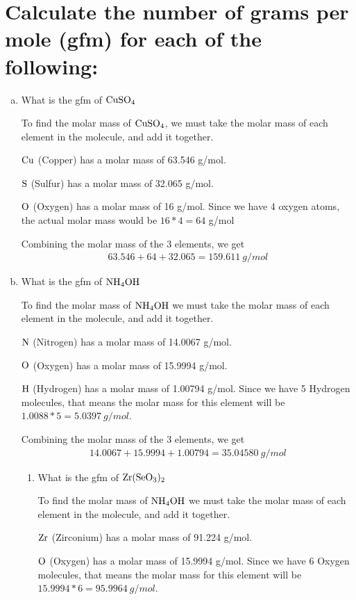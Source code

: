 \documentclass[11pt]{article}
\begin{document}
\section{Calculate the number of grams per mole (gfm) for each of the following:}
\label{sec:org96969ac}
\begin{enumerate}[(a)]
\item What is the gfm of \(\ce{CuSO4}\)

To find the molar mass of \(\ce{CuSO4}\), we must take the molar mass of
each element in the molecule, and add it together.

\(\ce{Cu}\) (Copper) has a molar mass of 63.546 g/mol.

\(\ce{S}\) (Sulfur) has a molar mass of 32.065 g/mol.

\(\ce{O}\) (Oxygen) has a molar mass of 16 g/mol. Since we have 4 oxygen
atoms, the actual molar mass would be \(16*4=64\) g/mol

Combining the molar mass of the 3 elements, we get
\begin{align*}
63.546+64+32.065=159.611\ g/mol
\end{align*}

\item What is the gfm of \(\ce{NH4OH}\)

To find the molar mass of \(\ce{NH4OH}\) we must take the molar mass of each element in the molecule, and add it together.

\(\ce{N}\) (Nitrogen) has a molar mass of 14.0067 g/mol.

\(\ce{O}\) (Oxygen) has a molar mass of 15.9994 g/mol.

\(\ce{H}\) (Hydrogen) has a molar mass of 1.00794 g/mol. Since we have 5
Hydrogen molecules, that means the molar mass for this element will be
\(1.0088*5=5.0397\ g/mol\).

Combining the molar mass of the 3 elements, we get
\begin{align*}
14.0067+15.9994+1.00794=35.04580\ g/mol
\end{align*}

\begin{enumerate}
\item What is the gfm of \(\ce{Zr(SeO3)2}\)

To find the molar mass of \(\ce{NH4OH}\) we must take the molar mass of each element in the molecule, and add it together.

\(\ce{Zr}\) (Zirconium) has a molar mass of 91.224 g/mol.

\(\ce{O}\) (Oxygen) has a molar mass of 15.9994 g/mol. Since we have 6
Oxygen molecules, that means the molar mass for this element will be
\(15.9994*6=95.9964\ g/mol\).


\end{enumerate}
\end{enumerate}
\end{document}
